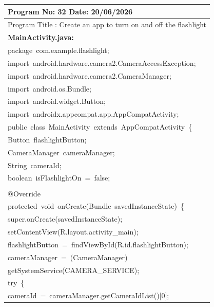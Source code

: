 \documentclass[a4paper,12pt]{article}
\begin{document}
\newpage

\noindent\begingroup
\renewcommand{\arraystretch}{1.1}
\begin{longtable}{|p{}|}
\hline\endfirsthead\hline\endhead\hline\endfoot\hline\endlastfoot
\rule{0pt}{13pt}Program No: 32 \hfill Date: 20/06/2026 \\
\hline
\rule{0pt}{13pt}Program Title : Create an app to turn on and off the flashlight \\
\hline
\rule{0pt}{13pt}\textbf{MainActivity.java:} \\
\hline
{\ttfamily\small package\ com.example.flashlight;} \\
{\ttfamily\small import\ android.hardware.camera2.CameraAccessException;} \\
{\ttfamily\small import\ android.hardware.camera2.CameraManager;} \\
{\ttfamily\small import\ android.os.Bundle;} \\
{\ttfamily\small import\ android.widget.Button;} \\
{\ttfamily\small import\ androidx.appcompat.app.AppCompatActivity;} \\
{\ttfamily\small public\ class\ MainActivity\ extends\ AppCompatActivity\ \{} \\
{\ttfamily\small Button\ flashlightButton;} \\
{\ttfamily\small CameraManager\ cameraManager;} \\
{\ttfamily\small String\ cameraId;} \\
{\ttfamily\small boolean\ isFlashlightOn\ =\ false;} \\
\strut \\
{\ttfamily\small @Override} \\
{\ttfamily\small protected\ void\ onCreate(Bundle\ savedInstanceState)\ \{} \\
{\ttfamily\small super.onCreate(savedInstanceState);} \\
{\ttfamily\small setContentView(R.layout.activity\_main);} \\
{\ttfamily\small flashlightButton\ =\ findViewById(R.id.flashlightButton);} \\
{\ttfamily\small cameraManager\ =\ (CameraManager)} \\
{\ttfamily\small getSystemService(CAMERA\_SERVICE);} \\
{\ttfamily\small try\ \{} \\
{\ttfamily\small cameraId\ =\ cameraManager.getCameraIdList()[0];} \\

\end{longtable}
\end{document}
